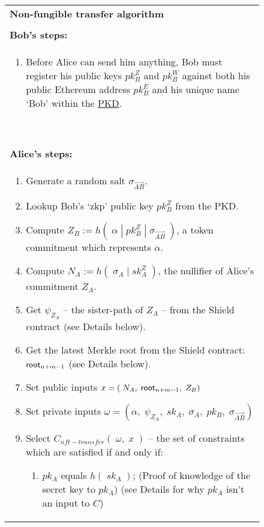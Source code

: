 \begin{figure}[htbp]
  \ContinuedFloat*
	\begin{center}
		\begin{framed}
      \begin{tabular}{p{16cm}}	
       \textbf{ Non-fungible transfer algorithm} \\
        \\
        \midrule
        \textbf{Bob's steps:}\\
        \begin{enumerate}
          \item Before Alice can send him anything, Bob must register his public keys $pk_B^Z$ and $pk_B^W$ against both his public Ethereum address $pk_B^E$ and his unique name `Bob' within the \hyperref[sec:pkd]{PKD}.
          \setcounter{ongoingEnumCounter}{\value{enumi}}
        \end{enumerate}
        \ \\
        \midrule
        \textbf{Alice's steps:}\\
        \begin{enumerate}
          \setcounter{enumi}{\value{ongoingEnumCounter}}
          \item Generate a random salt $\sigma_{\vec{AB}}$.
          \item Lookup Bob's `zkp' public key $pk_B^Z$ from the PKD.
          \item Compute $Z_B := h(\;\alpha\;|\;pk^Z_B\;|\;\sigma_{\vec{AB}}\;)$, a token commitment which represents $\alpha$.
          \item Compute $N_A := h(\;\sigma_{A}\;|\;sk^Z_A\;)$, the nullifier of Alice's commitment $Z_A$.
          \item Get $\psi_{Z_A}$ -- the sister-path of $Z_A$ -- from the Shield contract (see Details below).
          \item Get the latest Merkle root from the Shield contract: $\mathsf{root}_{n+m-1}$ (see Details below).
          \item Set public inputs $x = (\;N_A,\;\mathsf{root}_{n+m-1},\;Z_B)$
          \item Set private inputs $\omega = (\alpha,\;\psi_{Z_A},\;sk_A,\;\sigma_{A},\;pk_B,\;\sigma_{\vec{AB}})$
          \item Select $C_{nft-transfer}(\;\omega,\;x\;)$ -- the set of constraints which are satisfied if and only if:
          \begin{enumerate}
            \item $pk_A$ equals $h(\;sk_A\;)$; (Proof of knowledge of the secret key to $pk_A$) (see Details for why $pk_A$ isn't an input to $C$)

\end{enumerate}
\end{enumerate}
\end{tabular}
\end{framed}
\end{center}
\end{figure}
